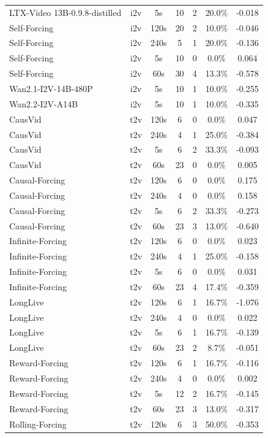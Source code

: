 \begin{table}[tb]
\begin{tabular}{lcccccc}
LTX-Video 13B-0.9.8-distilled & i2v & 5s & 10 & 2 & 20.0\% & -0.018 \\
Self-Forcing & i2v & 120s & 20 & 2 & 10.0\% & -0.046 \\
Self-Forcing & i2v & 240s & 5 & 1 & 20.0\% & -0.136 \\
Self-Forcing & i2v & 5s & 10 & 0 & 0.0\% & 0.064 \\
Self-Forcing & i2v & 60s & 30 & 4 & 13.3\% & -0.578 \\
Wan2.1-I2V-14B-480P & i2v & 5s & 10 & 1 & 10.0\% & -0.255 \\
Wan2.2-I2V-A14B & i2v & 5s & 10 & 1 & 10.0\% & -0.335 \\
CausVid & t2v & 120s & 6 & 0 & 0.0\% & 0.047 \\
CausVid & t2v & 240s & 4 & 1 & 25.0\% & -0.384 \\
CausVid & t2v & 5s & 6 & 2 & 33.3\% & -0.093 \\
CausVid & t2v & 60s & 23 & 0 & 0.0\% & 0.005 \\
Causal-Forcing & t2v & 120s & 6 & 0 & 0.0\% & 0.175 \\
Causal-Forcing & t2v & 240s & 4 & 0 & 0.0\% & 0.158 \\
Causal-Forcing & t2v & 5s & 6 & 2 & 33.3\% & -0.273 \\
Causal-Forcing & t2v & 60s & 23 & 3 & 13.0\% & -0.640 \\
Infinite-Forcing & t2v & 120s & 6 & 0 & 0.0\% & 0.023 \\
Infinite-Forcing & t2v & 240s & 4 & 1 & 25.0\% & -0.158 \\
Infinite-Forcing & t2v & 5s & 6 & 0 & 0.0\% & 0.031 \\
Infinite-Forcing & t2v & 60s & 23 & 4 & 17.4\% & -0.359 \\
LongLive & t2v & 120s & 6 & 1 & 16.7\% & -1.076 \\
LongLive & t2v & 240s & 4 & 0 & 0.0\% & 0.022 \\
LongLive & t2v & 5s & 6 & 1 & 16.7\% & -0.139 \\
LongLive & t2v & 60s & 23 & 2 & 8.7\% & -0.051 \\
Reward-Forcing & t2v & 120s & 6 & 1 & 16.7\% & -0.116 \\
Reward-Forcing & t2v & 240s & 4 & 0 & 0.0\% & 0.002 \\
Reward-Forcing & t2v & 5s & 12 & 2 & 16.7\% & -0.145 \\
Reward-Forcing & t2v & 60s & 23 & 3 & 13.0\% & -0.317 \\
Rolling-Forcing & t2v & 120s & 6 & 3 & 50.0\% & -0.353 \\

\end{tabular}
\end{table}
